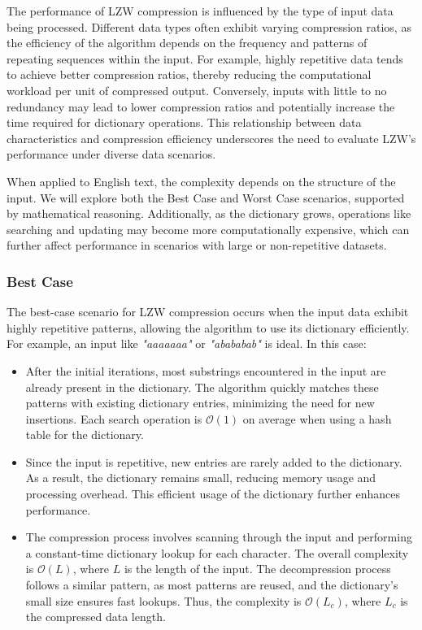 The performance of LZW compression is influenced by the type of input data being processed. Different data types often exhibit varying compression ratios, as the efficiency of the algorithm depends on the frequency and patterns of repeating sequences within the input. For example, highly repetitive data tends to achieve better compression ratios, thereby reducing the computational workload per unit of compressed output. Conversely, inputs with little to no redundancy may lead to lower compression ratios and potentially increase the time required for dictionary operations. This relationship between data characteristics and compression efficiency underscores the need to evaluate LZW’s performance under diverse data scenarios.

\vspace{10pt}

When applied to English text, the complexity depends on the structure of the input. We will explore both the Best Case and Worst Case scenarios, supported by mathematical reasoning. Additionally, as the dictionary grows, operations like searching and updating may become more computationally expensive, which can further affect performance in scenarios with large or non-repetitive datasets.

\vspace{10pt}

\subsubsection{Best Case}
The best-case scenario for LZW compression occurs when the input data exhibit highly repetitive patterns, allowing the algorithm to use its dictionary efficiently. For example, an input like \textit{"aaaaaaa"} or \textit{"abababab"} is ideal. In this case:

\begin{itemize}
    \item After the initial iterations, most substrings encountered in the input are already present in the dictionary. The algorithm quickly matches these patterns with existing dictionary entries, minimizing the need for new insertions. Each search operation is $\mathcal{O}(1)$ on average when using a hash table for the dictionary.
    \item Since the input is repetitive, new entries are rarely added to the dictionary. As a result, the dictionary remains small, reducing memory usage and processing overhead. This efficient usage of the dictionary further enhances performance.
    \item The compression process involves scanning through the input and performing a constant-time dictionary lookup for each character. The overall complexity is $\mathcal{O}(L)$, where $L$ is the length of the input. The decompression process follows a similar pattern, as most patterns are reused, and the dictionary's small size ensures fast lookups. Thus, the complexity is $\mathcal{O}(L_c)$, where $L_c$ is the compressed data length.
\end{itemize}

